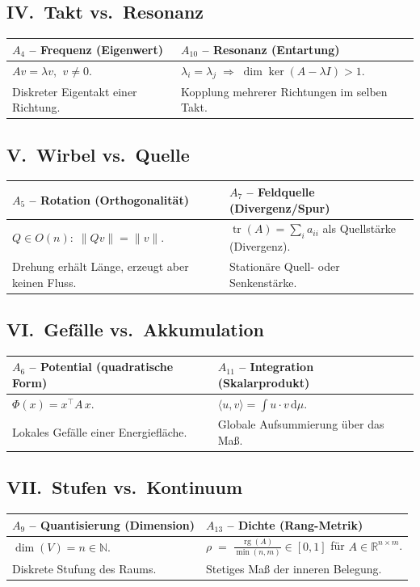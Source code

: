 \documentclass[11pt,a4paper]{article}
\newcommand{\tr}{\operatorname{tr}}
\newcommand{\rg}{\operatorname{rg}}
\newcommand{\T}{^{\!\top}}
\begin{document}
\subsection*{IV.\ Takt vs.\ Resonanz}
\begin{tabular}{@{}LL@{}}
  \toprule
  \textbf{$A_4$ -- Frequenz (Eigenwert)} &
  \textbf{$A_{10}$ -- Resonanz (Entartung)} \\
  \midrule
  $A v = \lambda v$, $\ v\neq 0$. &
  $\lambda_i = \lambda_j\;\Longrightarrow\;
   \dim\ker(A-\lambda I) > 1$. \\
  Diskreter Eigentakt einer Richtung. &
  Kopplung mehrerer Richtungen im selben Takt. \\
  \bottomrule
\end{tabular}

\subsection*{V.\ Wirbel vs.\ Quelle}
\begin{tabular}{@{}LL@{}}
  \toprule
  \textbf{$A_5$ -- Rotation (Orthogonalität)} &
  \textbf{$A_7$ -- Feldquelle (Divergenz/Spur)} \\
  \midrule
  $Q\in O(n):\; \lVert Q v\rVert = \lVert v\rVert$. &
  $\tr(A) = \sum_i a_{ii}$ als Quellstärke (Divergenz). \\
  Drehung erhält Länge, erzeugt aber keinen Fluss. &
  Stationäre Quell- oder Senkenstärke. \\
  \bottomrule
\end{tabular}

\subsection*{VI.\ Gefälle vs.\ Akkumulation}
\begin{tabular}{@{}LL@{}}
  \toprule
  \textbf{$A_6$ -- Potential (quadratische Form)} &
  \textbf{$A_{11}$ -- Integration (Skalarprodukt)} \\
  \midrule
  $\Phi(x) = x\T A\, x$. &
  $\langle u, v\rangle = \displaystyle\int u\cdot v\,\mathrm{d}\mu$. \\
  Lokales Gefälle einer Energiefläche. &
  Globale Aufsummierung über das Maß. \\
  \bottomrule
\end{tabular}

\subsection*{VII.\ Stufen vs.\ Kontinuum}
\begin{tabular}{@{}LL@{}}
  \toprule
  \textbf{$A_9$ -- Quantisierung (Dimension)} &
  \textbf{$A_{13}$ -- Dichte (Rang-Metrik)} \\
  \midrule
  $\dim(V) = n \in \mathbb{N}$. &
  $\displaystyle \rho \;=\; \frac{\rg(A)}{\min(n,m)} \in [0,1]$
   für $A\in\mathbb{R}^{n\times m}$. \\
  Diskrete Stufung des Raums. &
  Stetiges Maß der inneren Belegung. \\
  \bottomrule
\end{tabular}
\end{document}
